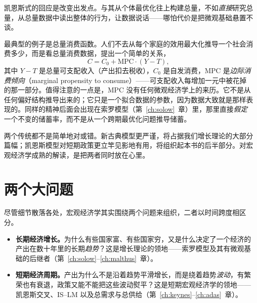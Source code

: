 凯恩斯式的回应是改变出发点。与其从个体最优化往上构建总量，不如\emph{直接}研究总量，从总量数据中读出整体的行为，让数据说话——哪怕代价是把微观基础悬置不谈。

最典型的例子是总量消费函数。人们不去从每个家庭的效用最大化推导一个社会消费多少，而是看总量消费数据，提出一个简单的关系，
\[
C = C_0 + \mathrm{MPC}\cdot(Y - T),
\]
其中 $Y - T$ 是总量可支配收入（产出扣去税收），$C_0$ 是自发消费，$\mathrm{MPC}$ 是\emph{边际消费倾向}（marginal propensity to consume）——可支配收入每增加一元中被花掉的那一部分。值得注意的一点是，$\mathrm{MPC}$ 没有任何微观经济学上的来历。它不是从任何偏好结构推导出来的；它只是一个拟合数据的参数，因为数据大致就是那样表现的。同样的精神后面会出现在索罗模型（第~\ref{ch:solow}~章）里，那里直接\emph{假定}一个不变的储蓄率，而不是从一个跨期最优化问题推导储蓄。


两个传统都不是简单地对或错。新古典模型更严谨，将占据我们增长理论的大部分篇幅；凯恩斯模型对短期政策更立竿见影地有用，将组织起本书的后半部分。对宏观经济学成熟的解读，是把两者同时放在心里。


\section{两个大问题}

尽管细节散落各处，宏观经济学其实围绕两个问题来组织，二者以时间跨度相区分。

\begin{itemize}
    \item \textbf{长期经济增长。}为什么有些国家富、有些国家穷，又是什么决定了一个经济的产出在数十年里的长期\emph{趋势}？这是增长理论的领地——索罗模型及其有微观基础的后继者（第~\ref{ch:solow}--\ref{ch:malthus}~章）。
    \item \textbf{短期经济周期。}产出为什么不是沿着趋势平滑增长，而是绕着趋势\emph{波动}，有繁荣也有衰退，政策又能不能把这些波动熨平？这是短期宏观经济学的领地——凯恩斯交叉、IS--LM 以及总需求与总供给（第~\ref{ch:keynes}--\ref{ch:adas}~章）。
\end{itemize}


